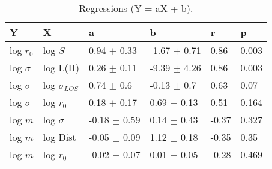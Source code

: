\begin{table}
\centering
\caption{Regressions (Y = aX + b).}
\begin{tabular}{llllll}
\toprule
            Y &                   X &                 a &                 b &      r &      p \\
\midrule
    log $r_0$ &             log $S$ &   0.94 $\pm$ 0.33 &  -1.67 $\pm$ 0.71 &   0.86 &  0.003 \\
 log $\sigma$ &            log L(H) &   0.26 $\pm$ 0.11 &  -9.39 $\pm$ 4.26 &   0.86 &  0.003 \\
 log $\sigma$ &  log $\sigma_{LOS}$ &    0.74 $\pm$ 0.6 &   -0.13 $\pm$ 0.7 &   0.63 &   0.07 \\
 log $\sigma$ &         log $r_{0}$ &   0.18 $\pm$ 0.17 &   0.69 $\pm$ 0.13 &   0.51 &  0.164 \\
      log $m$ &        log $\sigma$ &  -0.18 $\pm$ 0.59 &   0.14 $\pm$ 0.43 &  -0.37 &  0.327 \\
      log $m$ &            log Dist &  -0.05 $\pm$ 0.09 &   1.12 $\pm$ 0.18 &  -0.35 &   0.35 \\
      log $m$ &         log $r_{0}$ &  -0.02 $\pm$ 0.07 &   0.01 $\pm$ 0.05 &  -0.28 &  0.469 \\
\bottomrule
\end{tabular}
\end{table}
